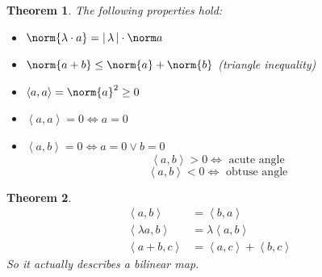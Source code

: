 \documentclass[a4paper,landscape,twocolumn]{article}
\newcommand\abs[1]{|\,#1\,|}
\newcommand\functional[1]{\left\langle{#1}\right\rangle}
\newtheorem{theorem}{Theorem}
\DeclarePairedDelimiter\norm\lVert\rVert
\begin{document}
\begin{theorem}
  \label{prop-8.2}
  The following properties hold:
  \begin{itemize}
    \item $\norm{\lambda \cdot a} = \abs{\lambda} \cdot \norm a$
    \item $\norm{a + b} \leq \norm{a} + \norm{b}$ (triangle inequality)
    \item $\functional{a,a} = \norm{a}^2 \geq 0$
    \item $\functional{a,a} = 0 \Leftrightarrow a = 0$
    \item $\functional{a,b} = 0 \Leftrightarrow a = 0 \lor b = 0$
      \[ \functional{a,b} > 0 \Leftrightarrow \text{ acute angle } \]
      \[ \functional{a,b} < 0 \Leftrightarrow \text{ obtuse angle } \]
  \end{itemize}
\end{theorem}

\begin{theorem}
  \label{satz-8.3}
  \begin{align}
    \functional{a,b} &= \functional{b,a} \\
    \functional{\lambda a,b} &= \lambda \functional{a,b} \\
    \functional{a+b,c} &= \functional{a,c} + \functional{b,c}
  \end{align}
  So it actually describes a bilinear map.
\end{theorem}
\end{document}
